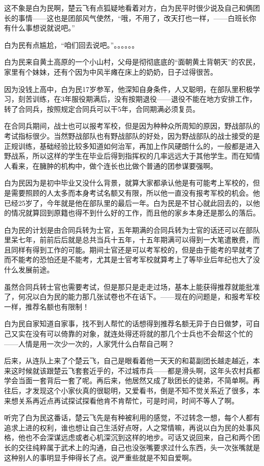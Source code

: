 这不象是白为民啊，楚云飞有点狐疑地看着对方，白为民平时很少说及自己和俩团长的事情——这也是团部风气使然，“哦，不用了，改天打也一样，——白班长你有什么事想说就说吧。”

白为民有点尴尬，“咱们回去说吧。”。。。。。。

白为民来自黄土高原的一个小山村，父母是彻彻底底的“面朝黄土背朝天”的农民，家里有个妹妹，还有个因为中风半瘫在床上的奶奶，日子过得很苦。

因为没钱上高中，白为民17岁参军，他深知自身条件，人又聪明，在部队里积极学习，刻苦训练，在3年服役期满后，没有按期退役——退役不能在地方安排工作，转了合同兵，按照规定合同兵可以干5年，合同期满必须复员。

在合同兵期间，战士也可以报考军校，但是因为种种众所周知的原因，野战部队的考试指标很少。当然野战部队也有野战部队的好处，因为野战部队的战士接受的是正规训练，基础经验比较多知道如何治军，再加上作风硬朗什么的，一般都是进入野战系，所以这样的学生在毕业后得到指挥权的几率远远大于其他学生。而在知情人看来，在臃肿的机构中，做个连长也比做个普通的团参谋要强啊。

白为民因为是初中毕业又没什么背景，就算大家都承认他是有可能考上军校的，但是需要照顾的人太多而本身考试名额又有限，所以他一直没有报考军校的机会。他已经25岁了，今年就是他在部队里的最后一年。白为民是不甘心就此回去的，以他的情况就算回到原籍也得不到什么好的工作，而且他的家乡本身还是那么的落后。

白为民的计划是由合同兵转为士官，五年期满的合同兵转为士官的话还可以在部队里呆七年，前前后后就是总共当兵十五年，十五年期满可以得到一大笔遣散费，而且同样有得到工作的可能。期间士官还是可以考军校的，但是由于能考的早就考了而不能考的恐怕还是不能考，尤其是士官考军校就算考上了等毕业后年纪也大了没什么发展前途。

虽然合同兵转士官也需要考试，但是那只是走走过场，基本上能获得推荐就能批准了，何况以白为民的能力那几张试卷也不在话下。——现在的问题是，和报考军校一样，推荐名额也有限制！

白为民自家知道自家事，找不到人帮忙的话想得到推荐名额无异于白日做梦，可自己又实在没有可以倚靠的对象，就连处得还将就的那几个士兵也不会帮这个忙的——人情是用一次少一次的，人家凭什么白帮自己啊？

后来，从连队上来了个楚云飞，自己是眼看着他一天天的和葛副团长越走越近，本来这时候就该跟楚云飞套套近乎的，不过城市兵——都是滑头啊，这年头农村兵都学会当面一套背后一套了呢。再后来，他居然又成了耿团长的徒弟，不简单啊。再往后，才发现这个小家伙真的很聪明，又爱看书，倒是不知不觉关系近了很多，本来想关系再近点再试探试探看他肯不肯帮忙，可是时间，时间不等人了啊。

听完了白为民这番话，楚云飞先是有种被利用的感觉，不过转念一想，每个人都有追求上进的权利，谁也想让自己生活好点呀，人之常情嘛，再说以白为民的处事风格，他也不会深谋远虑或者心机深沉到这样的地步。可话又说回来，自己和两个团长的交往纯粹属于武术上的沟通，自己也没张嘴要求过什么东西，头一次张嘴就是这种别人的事明显手伸得长了点。说严重些就是不知自爱啊。

